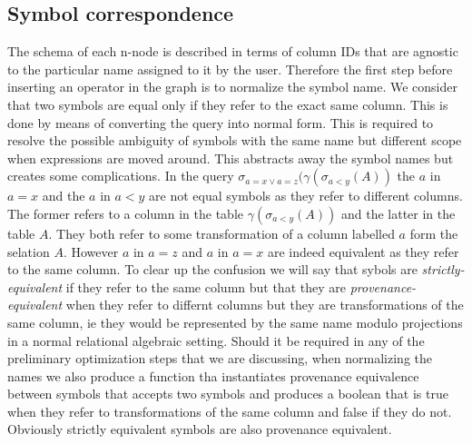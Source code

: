 \subsection{Symbol correspondence}
\label{sec:orgcc899ec}
The schema of each n-node is described in terms of column IDs that are
agnostic to the particular name assigned to it by the user. Therefore
the first step before inserting an operator in the graph is to
normalize the symbol name. We consider that two symbols are equal only
if they refer to the exact same column. This is done by means of
converting the query into normal form. This is required to resolve the
possible ambiguity of symbols with the same name but different scope
when expressions are moved around. This abstracts away the symbol
names but creates some complications. In the query \(\sigma_{a=x \lor
  a=z}(\gamma(\sigma_{a<y}(A))\) the \(a\) in \(a=x\) and the \(a\) in \(a < y\)
are not equal symbols as they refer to different columns. The former
refers to a column in the table \(\gamma(\sigma_{a<y}(A))\) and the
latter in the table \(A\). They both refer to some transformation of a
column labelled \(a\) form the selation \(A\). However \(a\) in \(a=z\) and
\(a\) in \(a=x\) are indeed equivalent as they refer to the same
column. To clear up the confusion we will say that sybols are
\emph{strictly-equivalent} if they refer to the same column but that they
are \emph{provenance-equivalent} when they refer to differnt columns but
they are transformations of the same column, ie they would be
represented by the same name modulo projections in a normal relational
algebraic setting. Should it be required in any of the preliminary
optimization steps that we are discussing, when normalizing the names
we also produce a function tha instantiates provenance equivalence
between symbols that accepts two symbols and produces a boolean that
is true when they refer to transformations of the same column and
false if they do not. Obviously strictly equivalent symbols are also
provenance equivalent.

